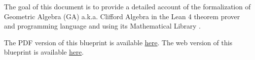 The goal of this document is to provide a detailed account
of the formalization of Geometric Algebra (GA) a.k.a. Clifford Algebra \cite{hestenes2012clifford}
in the Lean 4 theorem prover and programming language \cite{moura2021lean, moura2015lean, ullrich2023extensible}
and using its Mathematical Library \Mathlib \cite{mathlib2020lean}.

\ifplastex
The PDF version of this blueprint is available \href{./blueprint.pdf}{here}.
\else
The web version of this blueprint is available \href{https://utensil.github.io/lean-ga/blueprint/}{here}.
\fi





